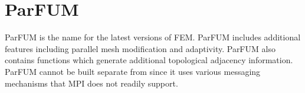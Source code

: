 \documentclass[10pt]{article}
\begin{document}
\section{ParFUM}
\label{sec:ParFUM}

ParFUM is the name for the latest versions of FEM.  ParFUM includes additional features including parallel mesh modification and adaptivity.  ParFUM also contains functions which generate additional topological adjacency information.  ParFUM cannot be built separate from \charmpp{} since it uses various messaging mechanisms that MPI does not readily support.








\end{document}
